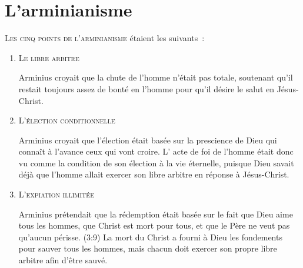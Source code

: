 \chapter{L'arminianisme}

\lettrine{L}{es \og cinq points de l'arminianisme \fg{}}\linebreak
 étaient les suivants~:

\begin{enumerate}
  \item  \textsc{Le libre arbitre}

\nobreak
\begin{pocketpar}{}
\begin{digestpar}{}
Arminius croyait que la chute de \pocketlinebreak
 l'homme
  n'était pas totale,
 soute\-nant qu'il restait toujours assez de bonté en l'homme
 pour qu'il désire le salut en Jésus-Christ.
\end{digestpar}
\end{pocketpar}

  \item  \textsc{L'élection conditionnelle}

\nobreak
\begin{digestpar}{}
Arminius croyait que l'élection\pocketlinebreak
 était basée sur la prescience
 de\pocketlinebreak
 Dieu qui connaît à l'avance ceux qui vont croire.
 L' \og acte de foi \fg{} de l'homme était donc vu comme la \og condition \fg{} 
 de son élection à la vie éternelle, puisque Dieu savait déjà
 que l'homme allait exercer son \og libre arbitre \fg{}
 en réponse à Jésus-Christ.
\end{digestpar}

  \item  \textsc{L'expiation illimitée}

\nobreak
\begin{digestpar}{}
Arminius prétendait que la rédemption était basée sur le fait
 que Dieu aime tous les hom\-mes, que Christ est mort pour tous,
 et que le Père ne veut pas qu'aucun périsse.
 (3:9)
 La mort du Christ a fourni à Dieu les fondements
 pour sauver tous les
 hommes, mais chacun doit exercer son propre
 \og libre arbitre \fg{} afin
 d'être sauvé.
\end{digestpar}


\end{enumerate}
